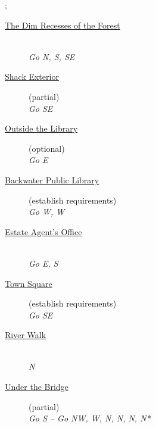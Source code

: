 \documentclass[a5paper]{extarticle}
\begin{document}
\begin{adjustbox}{center}
\sffamily\footnotesize
\begin{gamemap}[set grid={10em}{5em}]
;
\end{gamemap}
\end{adjustbox}

\newpage{}\label{sec:route-1}
\begin{description}
\item[{\hyperref[sec:req-The-Dim-Recesses-of-the-Forest]{The Dim Recesses of the Forest}}] ~\\
  \emph{Go N, S, SE}
\item[{\hyperref[sec:req-Shack-Exterior-0]{Shack Exterior}}] (partial)\\
  \emph{Go SE}
\item[{\hyperref[sec:req-Outside-the-Library]{Outside the Library}}] (optional)\\
  \emph{Go E}
\item[{\hyperref[sec:req-Public-Library-0]{Backwater Public Library}}] (establish requirements)\\
  \emph{Go W, W}
\item[{\hyperref[sec:req-Estate-Agent's-Office]{Estate Agent's Office}}] ~\\
  \emph{Go E, S}
\item[{\hyperref[sec:req-Town-Square-0]{Town Square}}] (establish requirements)\\
  \emph{Go SE}
\item[{\hyperref[sec:req-River-Walk]{River Walk}}] ~\\
  \emph{N}
\item[{\hyperref[sec:req-Under-the-Bridge-0]{Under the Bridge}}] (partial)\\
  \emph{Go S -- Go NW, W, N, N, N, N*}
\end{description}
\end{document}

